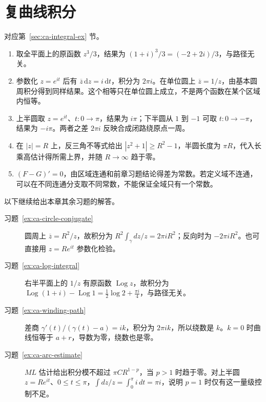 \section{复曲线积分}
对应第~\ref{sec:ca-integral-ex} 节。
\begin{enumerate}
 \item 取全平面上的原函数 $z^3/3$，结果为 $(1+i)^3/3=(-2+2i)/3$，与路径无关。
 \item 参数化 $z=e^{it}$ 后有 $\overline z\,\mathrm dz=i\,\mathrm dt$，积分为 $2\pi i$。在单位圆上 $\overline z=1/z$，由基本圆周积分得到同样结果。这个相等只在单位圆上成立，不是两个函数在某个区域内恒等。
 \item 上半圆取 $z=e^{it}$、$t:0\to\pi$，结果为 $i\pi$；下半圆从 $1$ 到 $-1$ 可取 $t:0\to-\pi$，结果为 $-i\pi$。两者之差 $2\pi i$ 反映合成闭路绕原点一周。
 \item 在 $|z|=R$ 上，反三角不等式给出 $|z^2+1|\ge R^2-1$，半圆长度为 $\pi R$，代入长乘高估计得所需上界，并随 $R\to\infty$ 趋于零。
 \item $(F-G)'=0$，由区域连通和前章习题结论得差为常数。若定义域不连通，可以在不同连通分支取不同常数，不能保证全域只有一个常数。
\end{enumerate}

以下继续给出本章其余习题的解答。
\begin{description}
 \item[习题~\ref{ex:ca-circle-conjugate}]
 圆周上 $\overline z=R^2/z$，故积分为 $R^2\int_\gamma dz/z=2\pi iR^2$；反向时为 $-2\pi iR^2$。也可直接用 $z=Re^{it}$ 参数化检验。
 \item[习题~\ref{ex:ca-log-integral}]
 右半平面上的 $1/z$ 有原函数 $\operatorname{Log}z$，故积分为 $\operatorname{Log}(1+i)-\operatorname{Log}1=\tfrac12\log2+\tfrac{\pi i}{4}$，与路径无关。
 \item[习题~\ref{ex:ca-winding-path}]
 差商 $\gamma'(t)/(\gamma(t)-a)=ik$，积分为 $2\pi ik$，所以绕数是 $k$。$k=0$ 时曲线恒等于 $a+r$，导数为零，绕数也是零。
 \item[习题~\ref{ex:ca-arc-estimate}]
 $ML$ 估计给出积分模不超过 $\pi C R^{1-p}$，当 $p>1$ 时趋于零。对上半圆 $z=Re^{it}$、$0\le t\le\pi$，$\int dz/z=\int_0^\pi i\,dt=\pi i$，说明 $p=1$ 时仅有这一量级控制不足。
\end{description}



